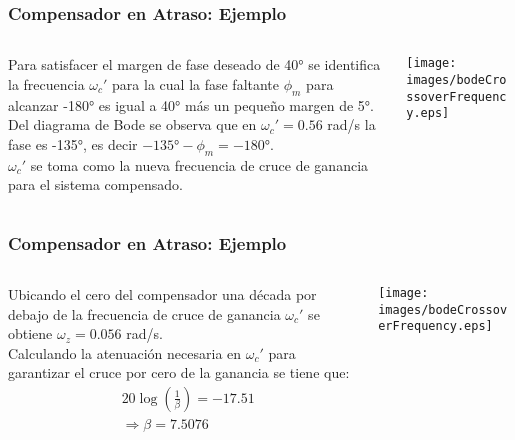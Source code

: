 \documentclass[aspectratio=169, handout]{beamer}
\theoremstyle{definition}
\theoremstyle{plain}
\theoremstyle{remark}
\begin{document}
\begin{frame}[<+->]\frametitle{Compensador en Atraso: Ejemplo}
	\vspace*{5mm}
	\begin{columns}
		\begin{column}{0.4\textwidth}
			\small Para satisfacer el margen de fase deseado de \ang{40} se identifica la frecuencia $\omega_c'$ para la cual la fase faltante $\phi_m$ para alcanzar -\ang{180} es igual a \ang{40} más un pequeño margen de \ang{5}.\\
			\vspace*{2mm}
			\pause
			Del diagrama de Bode se observa que en $\omega_c' = 0.56$ rad/s la fase es -\ang{135}, es decir $-\ang{135} - \phi_m = -\ang{180}$.\\
			\vspace*{2mm}
			\pause
			$\omega_c'$ se toma como la nueva frecuencia de cruce de ganancia para el sistema compensado.
		\end{column}		
		\begin{column}{0.6\textwidth}
				\centering
				\texttt{[image: images/bodeCrossoverFrequency.eps]} 	
		\end{column}		
	\end{columns}
\end{frame}

\begin{frame}[<+->]\frametitle{Compensador en Atraso: Ejemplo}
	\vspace*{5mm}
	\begin{columns}
		\begin{column}{0.4\textwidth}
			\small Ubicando el cero del compensador una década por debajo de la frecuencia de cruce de ganancia $\omega_c'$ se obtiene $\omega_z = 0.056$ rad/s.\\
			\vspace*{2mm}
			\pause
			Calculando la atenuación necesaria en $\omega_c'$ para garantizar el cruce por cero de la ganancia se tiene que:
			\begin{align*}
				&20 \log \left(\frac{1}{\beta}\right) = -17.51\\
				& \Longrightarrow \beta = 7.5076
			\end{align*}
		\end{column}		
		\begin{column}{0.6\textwidth}
				\centering
				\texttt{[image: images/bodeCrossoverFrequency.eps]} 	
		\end{column}		
	\end{columns}
\end{frame}
\end{document}
